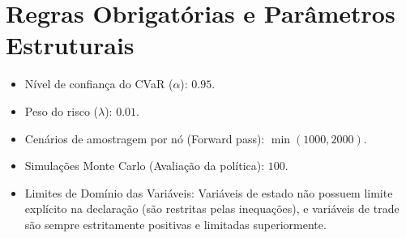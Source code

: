 \documentclass{article}
\begin{document}
\section{Regras Obrigatórias e Parâmetros Estruturais}
\begin{itemize}
    \item Nível de confiança do CVaR ($\alpha$): $0.95$.
    \item Peso do risco ($\lambda$): $0.01$.
    \item Cenários de amostragem por nó (Forward pass): $\min(1000, 2000)$.
    \item Simulações Monte Carlo (Avaliação da política): $100$.
    \item Limites de Domínio das Variáveis: Variáveis de estado não possuem limite explícito na declaração (são restritas pelas inequações), e variáveis de trade são sempre estritamente positivas e limitadas superiormente.
\end{itemize}
\end{document}
